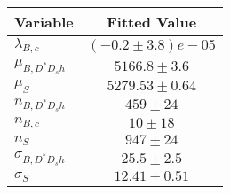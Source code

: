 \begin{tabular}[t]{lc}
\hline
Variable &Fitted Value\\
\hline\hline
$\lambda_{B,c}$&$(-0.2\pm3.8)e-05$\\
\hline
$\mu_{B, D^* D_s h}$&$5166.8\pm3.6$\\
\hline
$\mu_S$&$5279.53\pm0.64$\\
\hline
$n_{B, D^* D_s h}$&$459\pm24$\\
\hline
$n_{B,c}$&$10\pm18$\\
\hline
$n_S$&$947\pm24$\\
\hline
$\sigma_{B, D^* D_s h}$&$25.5\pm2.5$\\
\hline
$\sigma_S$&$12.41\pm0.51$\\
\hline
\end{tabular}